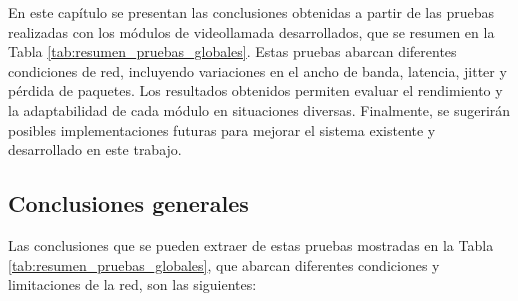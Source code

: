 \label{sec:conclusion}
En este capítulo se presentan las conclusiones obtenidas a partir de las pruebas realizadas con los módulos de videollamada desarrollados, que se resumen en la Tabla \ref{tab:resumen_pruebas_globales}. Estas pruebas abarcan diferentes condiciones de red, incluyendo variaciones en el ancho de banda, latencia, jitter y pérdida de paquetes. Los resultados obtenidos permiten evaluar el rendimiento y la adaptabilidad de cada módulo en situaciones diversas. Finalmente, se sugerirán posibles implementaciones futuras para mejorar el sistema existente y desarrollado en este trabajo.
\subsection{Conclusiones generales}
Las conclusiones que se pueden extraer de estas pruebas mostradas en la Tabla \ref{tab:resumen_pruebas_globales}, que abarcan diferentes condiciones y limitaciones de la red, son las siguientes:

